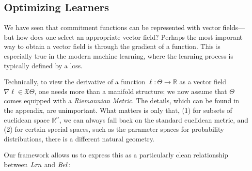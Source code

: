 

%
% 

\subsection{Optimizing Learners}
\label{sec:loss-repr}

\def\GD#1{\mathtt{GradFlow}[#1]}
\def\NGD#1{\mathtt{NGF}[#1]}

We have seen that commitment functions can be represented with vector fields---but how does one select an appropriate vector field? 
Perhaps the most imporant way to obtain a vector field is through the gradient of a function.
This is especially true in the modern machine learning, where the learning process is typically defined by a loss.  

Technically, to view the derivative of a function $\ell : \Theta \to \mathbb R$ as a vector field $\nabla \ell \in \mathfrak X\Theta$, one needs more than a manifold structure; we now assume that $\Theta$ comes equipped with a \emph{Riemannian Metric}. 
The details, which can be found in the appendix, are unimportant.
What matters is only that, (1) for subsets of euclidean space $\mathbb R^n$, we can always fall back on the standard euclidean metric, and (2) for certain special spaces, such as the parameter spaces for probability distributions, there is a different natural geometry. 

Our framework allows us to express this as a particularly clean relationship between $\mathit{Lrn}$ and $\mathit{Bel}$:

